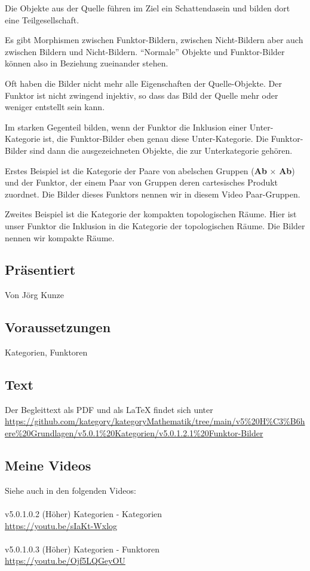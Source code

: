 \documentclass[a4paper]{amsart}
\theoremstyle{definition}
\begin{document}
Die Objekte aus der Quelle führen im Ziel ein Schattendasein und bilden dort eine Teilgesellschaft.

Es gibt Morphismen zwischen Funktor-Bildern, zwischen Nicht-Bildern aber auch zwischen Bildern und Nicht-Bildern. "`Normale"' Objekte und Funktor-Bilder können also in Beziehung zueinander stehen.

Oft haben die Bilder nicht mehr alle Eigenschaften der Quelle-Objekte. Der Funktor ist nicht zwingend injektiv, so dass das Bild der Quelle mehr oder weniger entstellt sein kann.

Im starken Gegenteil bilden, wenn der Funktor die Inklusion einer Unter-Kategorie ist, die Funktor-Bilder eben genau diese Unter-Kategorie. Die Funktor-Bilder sind dann die ausgezeichneten Objekte, die zur Unterkategorie gehören.

Erstes Beispiel ist die Kategorie der Paare von abelschen Gruppen (\textbf{Ab} $\times$ \textbf{Ab}) und der Funktor, der einem Paar von Gruppen deren cartesisches Produkt zuordnet. Die Bilder dieses Funktors nennen wir in diesem Video Paar-Gruppen.

Zweites Beispiel ist die Kategorie der kompakten topologischen Räume. Hier ist unser Funktor die Inklusion in die Kategorie der topologischen Räume. Die Bilder nennen wir kompakte Räume. 

\subsection*{Präsentiert}
Von Jörg Kunze

\subsection*{Voraussetzungen}
Kategorien, Funktoren

\subsection*{Text}
Der Begleittext als PDF und als LaTeX findet sich unter
{\tiny
   \url{https://github.com/kategory/kategoryMathematik/tree/main/v5%20H%C3%B6here%20Grundlagen/v5.0.1%20Kategorien/v5.0.1.2.1%20Funktor-Bilder}
}

\subsection*{Meine Videos}
Siehe auch in den folgenden Videos:\\
\\
v5.0.1.0.2 (Höher) Kategorien - Kategorien\\
\url{https://youtu.be/sIaKt-Wxlog}\\
\\
v5.0.1.0.3 (Höher) Kategorien - Funktoren\\
\url{https://youtu.be/Ojf5LQGeyOU}\\
\end{document}
